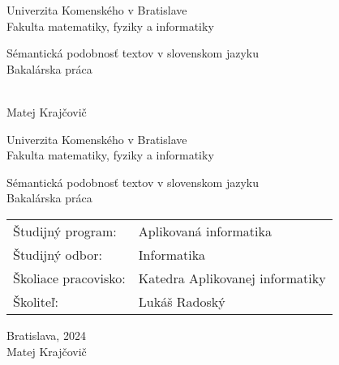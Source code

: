 \documentclass[12pt, twoside]{book}
\def\mfrok{2024}
\def\mfnazov{Sémantická podobnosť textov v slovenskom jazyku}
\def\mftyp{Bakalárska práca}
\def\mfautor{Matej Krajčovič}
\def\mfskolitel{Lukáš Radoský}
\def\mfkonzultant{tit. Meno Priezvisko, tit. }
\def\mfmiesto{Bratislava, \mfrok}
\def\mfodbor{ Informatika}
\def\program{ Aplikovaná informatika}
\def\mfpracovisko{ Katedra Aplikovanej informatiky }
\begin{document}
    
\frontmatter
\pagestyle{empty}


\begin{center}
\sc\large
Univerzita Komenského v Bratislave\\
Fakulta matematiky, fyziky a informatiky

\vfill

{\LARGE\mfnazov}\\
\mftyp
\end{center}

\vfill

{\sc\large 
\noindent \mfrok\\
\mfautor
}

\cleardoublepage



\noindent

\begin{center}
\sc  
\large
Univerzita Komenského v Bratislave\\
Fakulta matematiky, fyziky a informatiky

\vfill

{\LARGE\mfnazov}\\
\mftyp
\end{center}

\vfill

\noindent
\begin{tabular}{ll}
Študijný program: & \program \\
Študijný odbor: & \mfodbor \\
Školiace pracovisko: & \mfpracovisko \\
Školiteľ: & \mfskolitel \\
\end{tabular}

\vfill


\noindent \mfmiesto\\
\mfautor

\cleardoublepage



\newpage 
\setcounter{page}{2}

\end{document}
